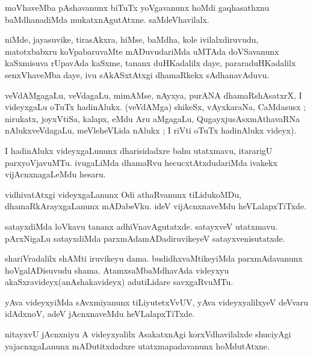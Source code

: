 \documentclass{article}
\begin{document}
\begin{mn}
moVhaveMba pAshavanunx biTuTx yoVgavanunx hoMdi gaqhasathxnu baMdhanadiMda mukatxnAgutAtxne. 
saMdeVhavilalx.
\end{mn}

\begin{mn}
niMde, jayasuvike, tirasAkxra, hiMse, baMdha, kole ivilalxdiruvudu, matotxbabxru koVpabaruvaMte 
mADuvudariMda uMTAda doVSavanunx kaSxmisuva rUpavAda kaSxme, tananx duHKadalilx  daye, 
pararaduHKadalilx senxVhaveMba daye, ivu sAkASxtAtxgi dhamaRkekx sAdhanavAduvu. 
\end{mn}

\begin{mn}
veVdAMgagaLu, veVdagaLu, mimAMse, nAyxya, purANA dhamaRshAsatxrX, I videyxgaLu oTuTx hadinAlukx. 
(veVdAMga) shikeSx, vAyxkaraNa, CaMdasusx ; nirukatx, joyxVtiSa, kalapx, eMdu Aru aMgagaLu, 
QugayxjusAsxmAthavaRNa nAlukxveVdagaLu, meVleheVLida nAlukx ; I riVti oTuTx hadinAlukx videyx).
\end{mn}

\begin{mn}
I hadinAlukx videyxgaLununx dharisidadxre bahu utatxmavu, itararigU parxyoVjavuMTu. ivugaLiMda 
dhamaRvu hecucxtAtxdudariMda ivakekx vijAcnxnagaLeMdu hesaru.
\end{mn}

\begin{mn}
vidhivatAtxgi videyxgaLanunx Odi athaRvanunx tiLidukoMDu, dhamaRkArayxgaLanunx mADabeVku. ideV 
vijAcnxnaveMdu heVLalapxTiTxde.
\end{mn}

\begin{mn}
satayxdiMda loVkavu tananx adhiVnavAgutatxde. satayxveV utatxmavu. pArxNigaLu satayxdiMda 
parxmAdamADadiruvikeyeV satayxvenisutatxde.
\end{mn}

\begin{mn}
shariVradalilx shAMti iruvikeyu dama. budidhxvaMtikeyiMda parxmAdavanunx hoVgalADisuvudu shama. 
AtamxsaMbaMdhavAda videyxyu akaSxravideyx(anAshakavideyx) adutiLidare savxgaRvuMTu.
\end{mn}

\begin{mn}
yAva videyxyiMda sAvxmiyanunx tiLiyutetxVvUV, yAva videyxyalilxyeV deVvaru idAdxnoV, adeV 
jAcnxnaveMdu heVLalapxTiTxde.
\end{mn}

\begin{mn}
nitayxvU jAcnxniyu A videyxyalilx AsakatxnAgi korxVdhavilalxde shuciyAgi yajacnxgaLanunx 
mADutitxdadxre utatxmapadavanunx hoMdutAtxne.
\end{mn}
\end{document}
